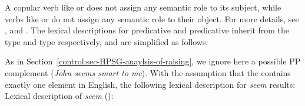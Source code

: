 A copular verb like  or  does not assign any semantic role to its subject, while
verbs like  or  do not assign any semantic role to their object. For
more details, see ,
\textcites[Section~2.2.7]{Mueller2002b}[]{MuellerPredication} and .  The lexical descriptions for predicative  and
predicative  inherit from the  type and 
type respectively, and are simplified as follows: 

As in Section~\ref{control:sec-HPSG-anaylsis-of-raising}, we ignore here a possible PP complement
(\textit{John seems smart to me}). With the assumption that the \subjl contains exactly one
  element in English, the following lexical description for \emph{seem} results:
\eas
Lexical description of \emph{seem} ():\\
\zs


